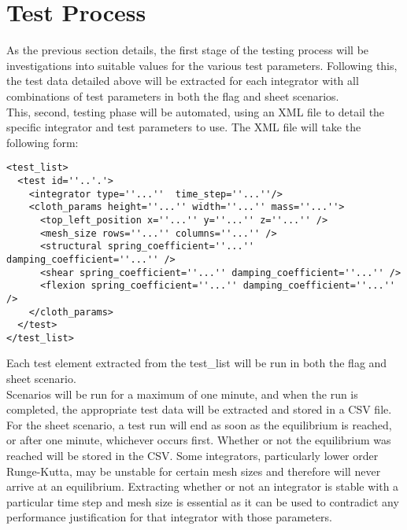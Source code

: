 \section{Test Process}
As the previous section details, the first stage of the testing process will be investigations into suitable values for the various test parameters. Following this, the test data detailed above will be extracted for each integrator with all combinations of test parameters in both the flag and sheet scenarios.
\\This, second, testing phase will be automated, using an XML file to detail the specific integrator and test parameters to use. The XML file will take the following form:
\begin{lstlisting}
<test_list>
  <test id=''..'.'>
    <integrator type=''...''  time_step=''...''/>
    <cloth_params height=''...'' width=''...'' mass=''...''>
      <top_left_position x=''...'' y=''...'' z=''...'' />
      <mesh_size rows=''...'' columns=''...'' />
      <structural spring_coefficient=''...'' damping_coefficient=''...'' />
      <shear spring_coefficient=''...'' damping_coefficient=''...'' />
      <flexion spring_coefficient=''...'' damping_coefficient=''...'' />
    </cloth_params>
  </test>
</test_list>
\end{lstlisting}
Each test element extracted from the test\_list will be run in both the flag and sheet scenario.
\\Scenarios will be run for a maximum of one minute, and when the run is completed, the appropriate test data will be extracted and stored in a CSV file. 
\\For the sheet scenario, a test run will end as soon as the equilibrium is reached, or after one minute, whichever occurs first. Whether or not the equilibrium was reached will be stored in the CSV. Some integrators, particularly lower order Runge-Kutta, may be unstable for certain mesh sizes and therefore will never arrive at an equilibrium. Extracting whether or not an integrator is stable with a particular time step and mesh size is essential as it can be used to contradict any performance justification for that integrator with those parameters.